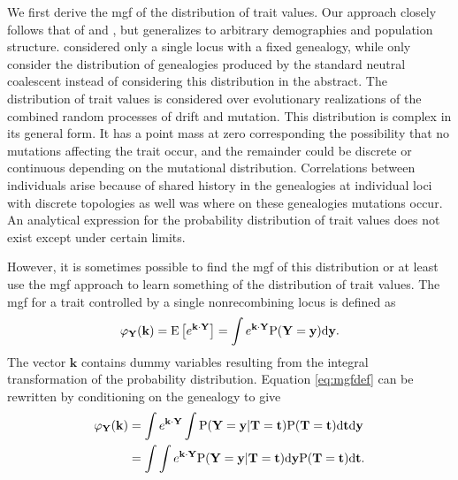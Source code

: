 We first derive the mgf of the distribution of trait values. Our approach
closely follows that of \citet{Schraiber2015} and \citet{Khaitovich2005}, but
generalizes to arbitrary demographies and population structure.
\citet{Khaitovich2005} considered only a single locus with a fixed genealogy,
while \citet{Schraiber2015} only consider the distribution of genealogies
produced by the standard neutral coalescent instead of considering this
distribution in the abstract. The distribution of trait values is considered
over evolutionary realizations of the combined random processes of drift and
mutation. This distribution is complex in its general form. It has a point mass
at zero corresponding the possibility that no mutations affecting the trait
occur, and the remainder could be discrete or continuous depending on the
mutational distribution. Correlations between individuals arise because of
shared history in the genealogies at individual loci with discrete topologies as
well was where on these genealogies mutations occur. An analytical expression
for the probability distribution of trait values does not exist except under
certain limits.

However, it is sometimes possible to find the mgf of this distribution or at
least use the mgf approach to learn something of the distribution of trait
values. The mgf for a trait controlled by a single nonrecombining locus is
defined as
\begin{equation}
  \label{eq:mgfdef}
  \varphi_{\mathbf{Y}}(\mathbf{k}) = \mathrm{E}\left[ e^{\mathbf{k} \cdot \mathbf{Y}} \right] =
  \int e^{\mathbf{k} \cdot \mathbf{Y}} \mathrm{P}(\mathbf{Y}=\mathbf{y}) \mbox{d}\mathbf{y}.
\end{equation}
The vector $\mathbf{k}$ contains dummy variables resulting from the integral
transformation of the probability distribution. Equation \eqref{eq:mgfdef} can be
rewritten by conditioning on the genealogy to give
\begin{align}
  \label{eq:cond}
  \varphi_{\mathbf{Y}}(\mathbf{k}) &= \int e^{\mathbf{k} \cdot \mathbf{Y}}
  \int \mathrm{P}(\mathbf{Y}=\mathbf{y} | \mathbf{T}=\mathbf{t}) \mathrm{P}(\mathbf{T}=\mathbf{t})
  \mbox{d}\mathbf{t} \mbox{d}\mathbf{y} \nonumber \\
  &= \int \int e^{\mathbf{k} \cdot \mathbf{Y}} \mathrm{P}(\mathbf{Y}=\mathbf{y} | \mathbf{T}=\mathbf{t}) \mbox{d}\mathbf{y}
  \mathrm{P}(\mathbf{T}=\mathbf{t})
  \mbox{d}\mathbf{t}.
\end{align}

